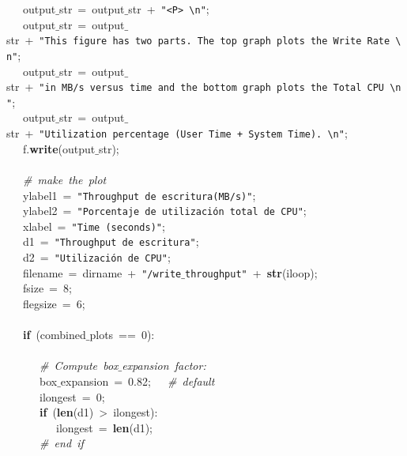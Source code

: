 \mbox{}\ \ \ output$\_$str\ =\ output$\_$str\ +\ \texttt{"{}\textless{}P\textgreater{}\ \textbackslash{}n"{}}; \\
\mbox{}\ \ \ output$\_$str\ =\ output$\_$str\ +\ \texttt{"{}This\ figure\ has\ two\ parts.\ The\ top\ graph\ plots\ the\ Write\ Rate\ \textbackslash{}n"{}}; \\
\mbox{}\ \ \ output$\_$str\ =\ output$\_$str\ +\ \texttt{"{}in\ MB/s\ versus\ time\ and\ the\ bottom\ graph\ plots\ the\ Total\ CPU\ \textbackslash{}n"{}}; \\
\mbox{}\ \ \ output$\_$str\ =\ output$\_$str\ +\ \texttt{"{}Utilization\ percentage\ (User\ Time\ +\ System\ Time).\ \textbackslash{}n"{}}; \\
\mbox{}\ \ \ f.\textbf{write}(output$\_$str); \\
\mbox{}\ \ \  \\
\mbox{}\ \ \ \textit{\#\ make\ the\ plot} \\
\mbox{}\ \ \ ylabel1\ =\ \texttt{"{}Throughput\ de\ escritura(MB/s)"{}}; \\
\mbox{}\ \ \ ylabel2\ =\ \texttt{"{}Porcentaje\ de\ utilización\ total\ de\ CPU"{}}; \\
\mbox{}\ \ \ xlabel\ =\ \texttt{"{}Time\ (seconds)"{}}; \\
\mbox{}\ \ \ d1\ =\ \texttt{"{}Throughput\ de\ escritura"{}}; \\
\mbox{}\ \ \ d2\ =\ \texttt{"{}Utilización\ de\ CPU"{}}; \\
\mbox{}\ \ \ filename\ =\ dirname\ +\ \texttt{"{}/write$\_$throughput"{}}\ +\ \textbf{str}(iloop); \\
\mbox{}\ \ \ fsize\ =\ 8; \\
\mbox{}\ \ \ flegsize\ =\ 6; \\
\mbox{}\ \ \  \\
\mbox{}\ \ \ \textbf{if}\ (combined$\_$plots\ ==\ 0): \\
\mbox{}\ \ \ \ \ \  \\
\mbox{}\ \ \ \ \ \ \textit{\#\ Compute\ box$\_$expansion\ factor:} \\
\mbox{}\ \ \ \ \ \ box$\_$expansion\ =\ 0.82;\ \ \ \textit{\#\ default} \\
\mbox{}\ \ \ \ \ \ ilongest\ =\ 0; \\
\mbox{}\ \ \ \ \ \ \textbf{if}\ (\textbf{len}(d1)\ \textgreater{}\ ilongest): \\
\mbox{}\ \ \ \ \ \ \ \ \ ilongest\ =\ \textbf{len}(d1); \\
\mbox{}\ \ \ \ \ \ \textit{\#\ end\ if} \\
